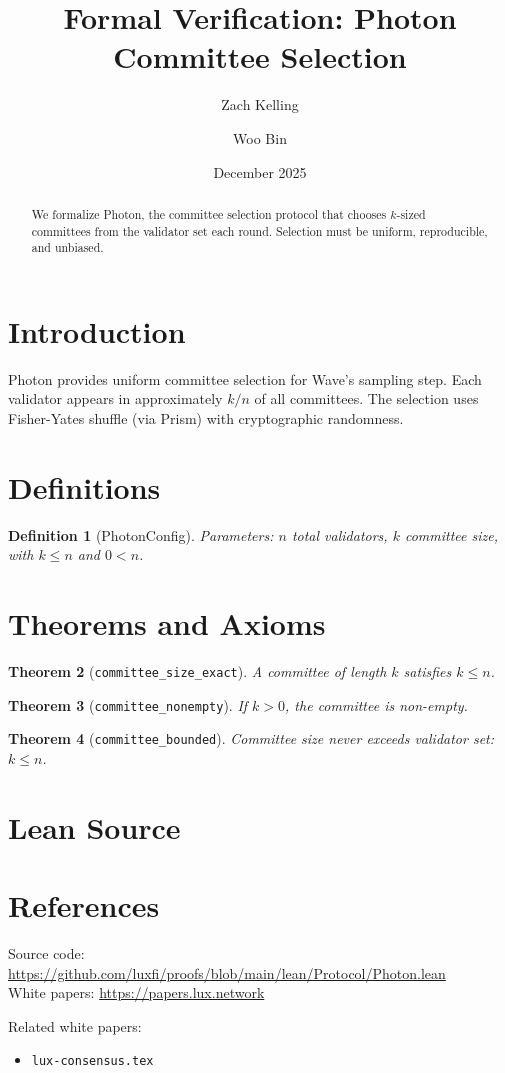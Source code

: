 \documentclass[11pt]{article}
\title{Formal Verification: Photon Committee Selection}
\author{Zach Kelling \and Woo Bin}
\date{December 2025}
\newtheorem{theorem}{Theorem}
\newtheorem{definition}[theorem]{Definition}
\begin{document}
\maketitle

\begin{abstract}
We formalize Photon, the committee selection protocol that chooses $k$-sized committees from the validator set each round. Selection must be uniform, reproducible, and unbiased.
\end{abstract}

\section{Introduction}
Photon provides uniform committee selection for Wave's sampling step. Each validator appears in approximately $k/n$ of all committees. The selection uses Fisher-Yates shuffle (via Prism) with cryptographic randomness.

\section{Definitions}
\begin{definition}[PhotonConfig]
Parameters: $n$ total validators, $k$ committee size, with $k \leq n$ and $0 < n$.
\end{definition}


\section{Theorems and Axioms}
\begin{theorem}[\texttt{committee\_size\_exact}]
A committee of length $k$ satisfies $k \leq n$.
\end{theorem}

\begin{theorem}[\texttt{committee\_nonempty}]
If $k > 0$, the committee is non-empty.
\end{theorem}

\begin{theorem}[\texttt{committee\_bounded}]
Committee size never exceeds validator set: $k \leq n$.
\end{theorem}


\section{Lean Source}


\section{References}
\noindent Source code: \url{https://github.com/luxfi/proofs/blob/main/lean/Protocol/Photon.lean}\\
\noindent White papers: \url{https://papers.lux.network}

\noindent Related white papers:
\begin{itemize}
  \item \texttt{lux-consensus.tex}
\end{itemize}
\end{document}
